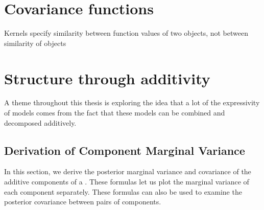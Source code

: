 \section{Covariance functions}

Kernels specify similarity between function values of two objects, not between similarity of objects





\section{Structure through additivity}

A theme throughout this thesis is exploring the idea that a lot of the expressivity of \gp{} models comes from the fact that these models can be combined and decomposed additively.


\subsection{Derivation of Component Marginal Variance}

In this section, we derive the posterior marginal variance and covariance of the additive components of a \gp{}.  These formulas let us plot the marginal variance of each component separately.  These formulas can also be used to examine the posterior covariance between pairs of components.

